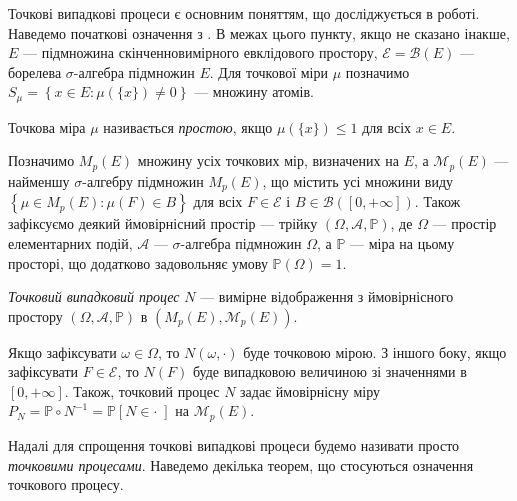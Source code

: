 Точкові випадкові процеси є основним поняттям, що досліджується в роботі.
Наведемо початкові означення з \cite{Resnick_1987}.
В межах цього пункту, якщо не сказано інакше,
$E$ --- підмножина скінченновимірного евклідового простору,
$\mathcal{E} = \mathcal{B}(E)$ --- борелева $\sigma$-алгебра підмножин $E$.
Для точкової міри $\mu$ позначимо 
$S_\mu = \left\{x \in E : \mu\left(\{x\}\right) \neq 0\right\}$ ---
множину атомів.
\begin{definition}
    Точкова міра $\mu$ називається \emph{простою},
    якщо $\mu\left(\{x\}\right) \leq 1$ для всіх $x \in E$.
\end{definition}
Позначимо $M_p(E)$ множину усіх точкових мір, визначених на $E$,
а $\mathcal{M}_p(E)$ --- найменшу $\sigma$-алгебру
підмножин $M_p(E)$, що містить усі множини виду
$\left\{
    \mu \in M_p(E) : \mu(F) \in B
\right\}$ для всіх $F \in \mathcal{E}$ і $B \in \mathcal{B}\left([0, +\infty]\right)$.
Також зафіксуємо деякий ймовірнісний простір --- трійку
$\left(\Omega, \mathcal{A}, \mathbb{P}\right)$, де
$\Omega$ --- простір елементарних подій, $\mathcal{A}$ ---
$\sigma$-алгебра підмножин $\Omega$, а $\mathbb{P}$ --- міра на цьому просторі,
що додатково задовольняє умову $\mathbb{P}\left(\Omega\right) = 1$.
\begin{definition} 
    \emph{Точковий випадковий процес} $N$ --- вимірне відображення
    з ймовірнісного простору $\left(\Omega, \mathcal{A}, \mathbb{P}\right)$
    в $\left(M_p(E), \mathcal{M}_p(E)\right)$.
\end{definition}
Якщо зафіксувати $\omega \in \Omega$, то $N(\omega, \cdot)$
буде точковою мірою. З іншого боку, якщо зафіксувати $F \in \mathcal{E}$,
то $N(F)$ буде випадковою величиною зі значеннями в $[0, +\infty]$.
Також, точковий процес $N$ задає ймовірнісну міру 
$P_N = \mathbb{P} \circ N^{-1} = \mathbb{P}\left[N \in \cdot \; \right]$
на $\mathcal{M}_p(E)$.

Надалі для спрощення точкові випадкові процеси
будемо називати просто \emph{точковими процесами}. Наведемо
декілька теорем, що стосуються означення точкового процесу.

